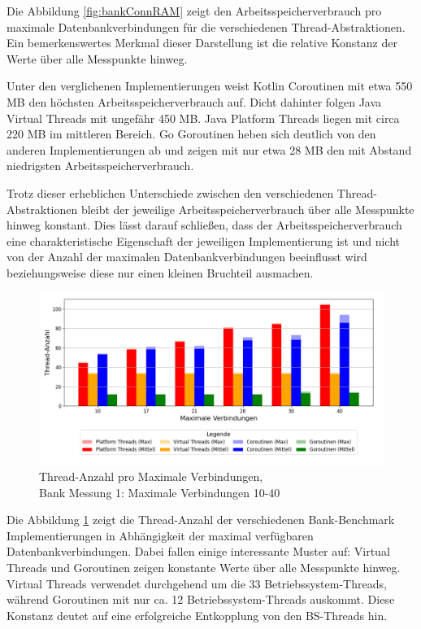 \documentclass[fontsize=12pt,paper=a4,twoside=semi,parskip=half-,headsepline,headinclude]{scrreprt}
\begin{document}
Die Abbildung \ref{fig:bankConnRAM} zeigt den Arbeitsspeicherverbrauch pro maximale Datenbankverbindungen für die verschiedenen Thread-Abstraktionen. Ein bemerkenswertes Merkmal dieser Darstellung ist die relative Konstanz der Werte über alle Messpunkte hinweg.

Unter den verglichenen Implementierungen weist Kotlin Coroutinen mit etwa 550 MB den höchsten Arbeitsspeicherverbrauch auf. Dicht dahinter folgen Java Virtual Threads mit ungefähr 450 MB. Java Platform Threads liegen mit circa 220 MB im mittleren Bereich. Go Goroutinen heben sich deutlich von den anderen Implementierungen ab und zeigen mit nur etwa 28 MB den mit Abstand niedrigsten Arbeitsspeicherverbrauch.

Trotz dieser erheblichen Unterschiede zwischen den verschiedenen Thread-Abstraktionen bleibt der jeweilige Arbeitsspeicherverbrauch über alle Messpunkte hinweg konstant. Dies lässt darauf schließen, dass der Arbeitsspeicherverbrauch eine charakteristische Eigenschaft der jeweiligen Implementierung ist und nicht von der Anzahl der maximalen Datenbankverbindungen beeinflusst wird beziehungsweise diese nur einen kleinen Bruchteil ausmachen.

\begin{figure}[H]
	\centering
	\includegraphics[scale=0.5]{figures/bank/connections10-40/num_threads_bar_plot.png}
	\caption{Thread-Anzahl pro Maximale Verbindungen,\\ Bank Messung 1: Maximale Verbindungen 10-40}
	\label{fig:bankConnThreads}
\end{figure}

Die Abbildung \ref{fig:bankConnThreads} zeigt die Thread-Anzahl der verschiedenen Bank-Benchmark Implementierungen in Abhängigkeit der maximal verfügbaren Datenbankverbindungen. Dabei fallen einige interessante Muster auf:
Virtual Threads und Goroutinen zeigen konstante Werte über alle Messpunkte hinweg. Virtual Threads verwendet durchgehend um die 33 Betriebssystem-Threads, während Goroutinen mit nur ca. 12 Betriebssystem-Threads auskommt. Diese Konstanz deutet auf eine erfolgreiche Entkopplung von den BS-Threads hin.
\end{document}
